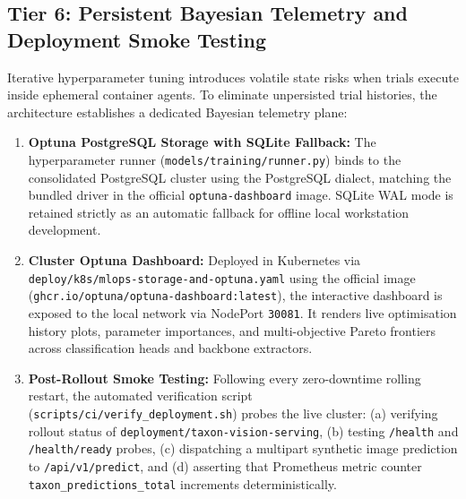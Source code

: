 \subsection{Tier 6: Persistent Bayesian Telemetry and Deployment Smoke Testing}
\label{subsec:tier6_bayesian_telemetry}

Iterative hyperparameter tuning introduces volatile state risks when trials execute inside ephemeral container agents. To eliminate unpersisted trial histories, the architecture establishes a dedicated Bayesian telemetry plane:
\begin{enumerate}
    \item \textbf{Optuna PostgreSQL Storage with SQLite Fallback:} The hyperparameter runner (\texttt{models/training/runner.py}) binds to the consolidated PostgreSQL cluster using the PostgreSQL dialect, matching the bundled driver in the official \texttt{optuna-dashboard} image. SQLite WAL mode is retained strictly as an automatic fallback for offline local workstation development.
    \item \textbf{Cluster Optuna Dashboard:} Deployed in Kubernetes via \texttt{deploy/k8s/}\allowbreak\texttt{mlops-}\allowbreak\texttt{storage-}\allowbreak\texttt{and-}\allowbreak\texttt{optuna.yaml} using the official image (\texttt{ghcr.io/optuna/optuna-dashboard:latest}), the interactive dashboard is exposed to the local network via NodePort \texttt{30081}. It renders live optimisation history plots, parameter importances, and multi-objective Pareto frontiers across classification heads and backbone extractors.
    \item \textbf{Post-Rollout Smoke Testing:} Following every zero-downtime rolling restart, the automated verification script (\nolinkurl{scripts/ci/verify_deployment.sh}) probes the live cluster: (a) verifying rollout status of \texttt{deployment/taxon-vision-serving}, (b) testing \texttt{/health} and \texttt{/health/ready} probes, (c) dispatching a multipart synthetic image prediction to \nolinkurl{/api/v1/predict}, and (d) asserting that Prometheus metric counter \texttt{taxon\_\allowbreak predictions\_\allowbreak total} increments deterministically.
\end{enumerate}
